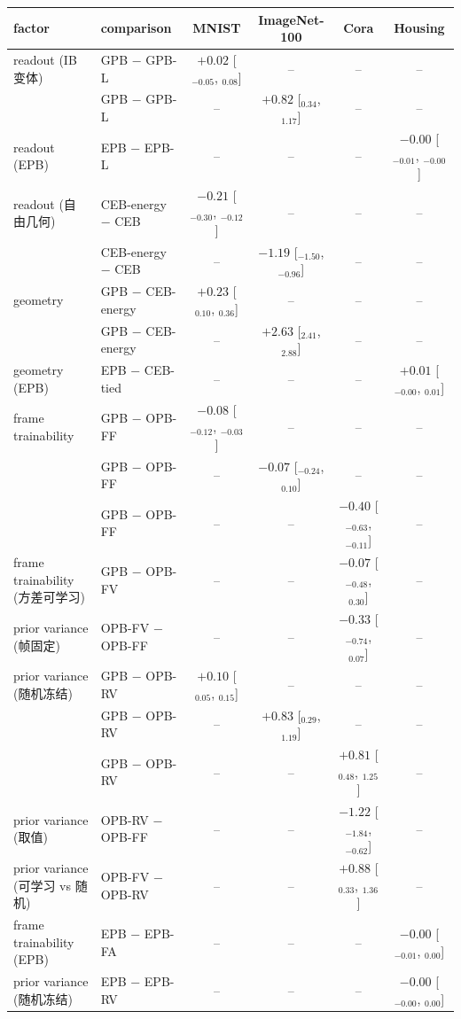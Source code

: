 \begin{tabular}{l l c c c c}
\hline
factor & comparison & MNIST & ImageNet-100 & Cora & Housing \\
\hline
readout (IB 变体) & GPB − GPB-L & $+0.02$ [$_{-0.05}$, $_{0.08}$] & -- & -- & -- \\
 & GPB − GPB-L & -- & $+0.82$ [$_{0.34}$, $_{1.17}$] & -- & -- \\
readout (EPB) & EPB − EPB-L & -- & -- & -- & $-0.00$ [$_{-0.01}$, $_{-0.00}$] \\
readout (自由几何) & CEB-energy − CEB & $-0.21$ [$_{-0.30}$, $_{-0.12}$] & -- & -- & -- \\
 & CEB-energy − CEB & -- & $-1.19$ [$_{-1.50}$, $_{-0.96}$] & -- & -- \\
geometry & GPB − CEB-energy & $+0.23$ [$_{0.10}$, $_{0.36}$] & -- & -- & -- \\
 & GPB − CEB-energy & -- & $+2.63$ [$_{2.41}$, $_{2.88}$] & -- & -- \\
geometry (EPB) & EPB − CEB-tied & -- & -- & -- & $+0.01$ [$_{-0.00}$, $_{0.01}$] \\
frame trainability & GPB − OPB-FF & $-0.08$ [$_{-0.12}$, $_{-0.03}$] & -- & -- & -- \\
 & GPB − OPB-FF & -- & $-0.07$ [$_{-0.24}$, $_{0.10}$] & -- & -- \\
 & GPB − OPB-FF & -- & -- & $-0.40$ [$_{-0.63}$, $_{-0.11}$] & -- \\
frame trainability (方差可学习) & GPB − OPB-FV & -- & -- & $-0.07$ [$_{-0.48}$, $_{0.30}$] & -- \\
prior variance (帧固定) & OPB-FV − OPB-FF & -- & -- & $-0.33$ [$_{-0.74}$, $_{0.07}$] & -- \\
prior variance (随机冻结) & GPB − OPB-RV & $+0.10$ [$_{0.05}$, $_{0.15}$] & -- & -- & -- \\
 & GPB − OPB-RV & -- & $+0.83$ [$_{0.29}$, $_{1.19}$] & -- & -- \\
 & GPB − OPB-RV & -- & -- & $+0.81$ [$_{0.48}$, $_{1.25}$] & -- \\
prior variance (取值) & OPB-RV − OPB-FF & -- & -- & $-1.22$ [$_{-1.84}$, $_{-0.62}$] & -- \\
prior variance (可学习 vs 随机) & OPB-FV − OPB-RV & -- & -- & $+0.88$ [$_{0.33}$, $_{1.36}$] & -- \\
frame trainability (EPB) & EPB − EPB-FA & -- & -- & -- & $-0.00$ [$_{-0.01}$, $_{0.00}$] \\
prior variance (随机冻结) & EPB − EPB-RV & -- & -- & -- & $-0.00$ [$_{-0.00}$, $_{0.00}$] \\

\end{tabular}
